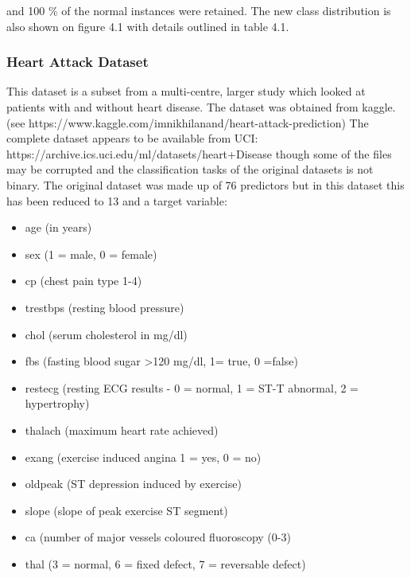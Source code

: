 and 100 \% of the normal instances were retained. The new class distribution is also shown on figure 4.1 with details outlined in table 4.1.\newline

\subsubsection{Heart Attack Dataset}
This dataset is a subset from a multi-centre, larger study which looked at patients with and without heart disease. The dataset was obtained from kaggle.\newline 
(see https://www.kaggle.com/imnikhilanand/heart-attack-prediction) \newline
The complete dataset appears to be available from UCI:\newline
https://archive.ics.uci.edu/ml/datasets/heart+Disease \newline 
though some of the files may be corrupted and the classification tasks of the original datasets is not binary.
The original dataset was made up of 76 predictors but in this dataset this has been reduced to 13 and a target variable:
\begin{itemize}
    \item age (in years)
    \item sex (1 = male, 0 = female) 
    \item cp (chest pain type 1-4)
    \item trestbps (resting blood pressure)
    \item chol (serum cholesterol in mg/dl) 
    \item fbs (fasting blood sugar >120 mg/dl, 1= true, 0 =false) 
    \item restecg (resting ECG results - 0 = normal, 1 = ST-T abnormal, 2 = hypertrophy)
    \item thalach (maximum heart rate achieved)
    \item exang (exercise induced angina 1 = yes, 0 = no)
    \item oldpeak (ST depression induced by exercise)
    \item slope (slope of peak exercise ST segment)
    \item ca (number of major vessels coloured fluoroscopy (0-3) 
    \item thal (3 = normal, 6 = fixed defect, 7 = reversable defect) 
\end{itemize}

